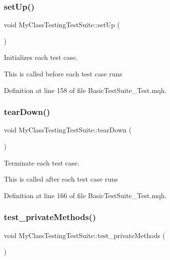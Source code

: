 \subsubsection{\texorpdfstring{set\+Up()}{setUp()}}
{\footnotesize\ttfamily void My\+Class\+Testing\+Test\+Suite\+::set\+Up (\begin{DoxyParamCaption}{ }\end{DoxyParamCaption})\hspace{0.3cm}{\ttfamily [inline]}}



Initializes each test case. 

This is called before each test case runs 

Definition at line 158 of file Basic\+Test\+Suite\+\_\+\+Test.\+mqh.

\mbox{\label{class_my_class_testing_test_suite_a57d7a3ad48dae9c768a2ec17f65503c4}} 
\subsubsection{\texorpdfstring{tear\+Down()}{tearDown()}}
{\footnotesize\ttfamily void My\+Class\+Testing\+Test\+Suite\+::tear\+Down (\begin{DoxyParamCaption}{ }\end{DoxyParamCaption})\hspace{0.3cm}{\ttfamily [inline]}}



Terminate each test case. 

This is called after each test case runs 

Definition at line 166 of file Basic\+Test\+Suite\+\_\+\+Test.\+mqh.

\mbox{\label{class_my_class_testing_test_suite_a4f3c0c96822f2d5d1a5ce80c47f156fb}} 
\subsubsection{\texorpdfstring{test\+\_\+private\+Methods()}{test\_privateMethods()}}
{\footnotesize\ttfamily void My\+Class\+Testing\+Test\+Suite\+::test\+\_\+private\+Methods (\begin{DoxyParamCaption}{ }\end{DoxyParamCaption})\hspace{0.3cm}{\ttfamily [inline]}}




